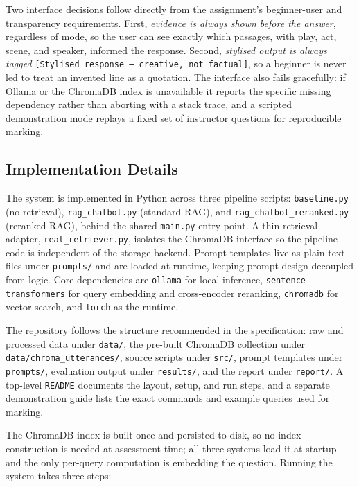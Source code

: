 Two interface decisions follow directly from the assignment's
beginner-user and transparency requirements. First, \emph{evidence is
always shown before the answer}, regardless of mode, so the user can see
exactly which passages, with play, act, scene, and speaker, informed the
response. Second, \emph{stylised output is always tagged}
\texttt{[Stylised response --- creative, not factual]}, so a beginner is
never led to treat an invented line as a quotation. The interface also
fails gracefully: if Ollama or the ChromaDB index is unavailable it
reports the specific missing dependency rather than aborting with a stack
trace, and a scripted demonstration mode replays a fixed set of
instructor questions for reproducible marking.

\subsection{Implementation Details}
The system is implemented in Python across three pipeline scripts:
\texttt{baseline.py} (no retrieval), \texttt{rag\_chatbot.py} (standard
RAG), and \texttt{rag\_chatbot\_reranked.py} (reranked RAG), behind the
shared \texttt{main.py} entry point. A thin retrieval adapter,
\texttt{real\_retriever.py}, isolates the ChromaDB interface so the
pipeline code is independent of the storage backend. Prompt templates
live as plain-text files under \texttt{prompts/} and are loaded at
runtime, keeping prompt design decoupled from logic. Core dependencies
are \texttt{ollama} for local inference,
\texttt{sentence-transformers} for query embedding and cross-encoder
reranking, \texttt{chromadb} for vector search, and \texttt{torch} as the
runtime.

The repository follows the structure recommended in the specification:
raw and processed data under \texttt{data/}, the pre-built ChromaDB
collection under \texttt{data/chroma\_utterances/}, source scripts under
\texttt{src/}, prompt templates under \texttt{prompts/}, evaluation output
under \texttt{results/}, and the report under \texttt{report/}. A
top-level \texttt{README} documents the layout, setup, and run steps, and
a separate demonstration guide lists the exact commands and example
queries used for marking.

The ChromaDB index is built once and persisted to disk, so no index
construction is needed at assessment time; all three systems load it at
startup and the only per-query computation is embedding the question.
Running the system takes three steps:


